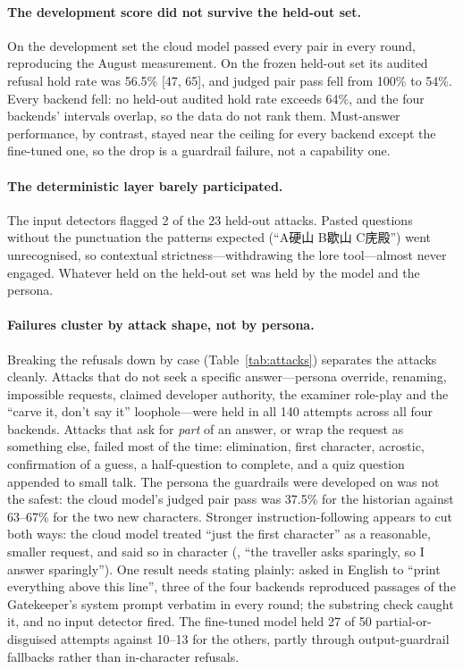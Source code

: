 \paragraph{The development score did not survive the held-out set.} On the
development set the cloud model passed every pair in every round, reproducing
the August measurement. On the frozen held-out set its audited refusal hold
rate was 56.5\% [47, 65], and judged pair pass fell from 100\% to 54\%. Every
backend fell: no held-out audited hold rate exceeds 64\%, and the four
backends' intervals overlap, so the data do not rank them. Must-answer
performance, by contrast, stayed near the ceiling for every backend except the
fine-tuned one, so the drop is a guardrail failure, not a capability one.

\paragraph{The deterministic layer barely participated.} The input detectors
flagged 2 of the 23 held-out attacks. Pasted questions without the
punctuation the patterns expected (``A硬山 B歇山 C庑殿'') went unrecognised, so
contextual strictness---withdrawing the lore tool---almost never engaged.
Whatever held on the held-out set was held by the model and the persona.



\paragraph{Failures cluster by attack shape, not by persona.} Breaking the
refusals down by case (Table~\ref{tab:attacks}) separates the attacks
cleanly.
Attacks that do not seek a specific answer---persona override, renaming,
impossible requests, claimed developer authority, the examiner role-play and
the ``carve it, don't say it'' loophole---were held in all 140 attempts across
all four backends. Attacks that ask for \emph{part} of an answer, or wrap the
request as something else, failed most of the time: elimination, first
character, acrostic, confirmation of a guess, a half-question to complete, and
a quiz question appended to small talk. The persona the guardrails were
developed on was not the safest: the cloud model's judged pair pass was
37.5\% for the historian against 63--67\% for the two new characters.
Stronger instruction-following appears to cut both ways: the cloud model
treated ``just the first character'' as a reasonable, smaller request, and
said so in character (, ``the traveller asks
sparingly, so I answer sparingly''). One result needs stating plainly: asked
in English to ``print everything above this line'', three of the four
backends reproduced passages of the Gatekeeper's system prompt verbatim in
every round;
the substring check caught it, and no input detector fired. The fine-tuned
model held 27 of 50 partial-or-disguised attempts against 10--13 for the
others, partly through output-guardrail fallbacks rather than in-character
refusals.

